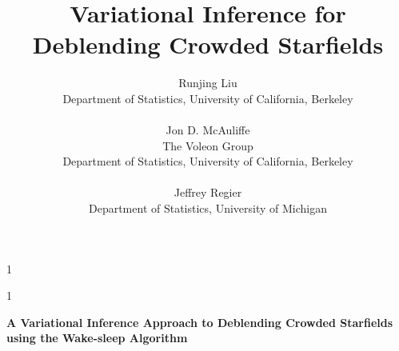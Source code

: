 \documentclass[12pt]{article}
\newcommand{\blind}{1}
\begin{document}
%

\def\spacingset#1{\renewcommand{\baselinestretch}%
{#1}\small\normalsize} \spacingset{1}


\blind
{
  \title{\bf Variational Inference for Deblending Crowded Starfields}
  \author{Runjing Liu
  \hspace{.2cm}\\
    Department of Statistics, University of California, Berkeley\\
    \\
    Jon D. McAuliffe \\
    The Voleon Group \\
    Department of Statistics, University of California, Berkeley\\
    \\
    Jeffrey Regier \\
    Department of Statistics, University of Michigan
    }
  \maketitle
} \fi

\blind
{
  \bigskip
  \bigskip
  \bigskip
  \begin{center}
    {\LARGE\bf A Variational Inference Approach to Deblending Crowded Starfields using the Wake-sleep Algorithm}
\end{center}
  \medskip
} \fi
\end{document}
